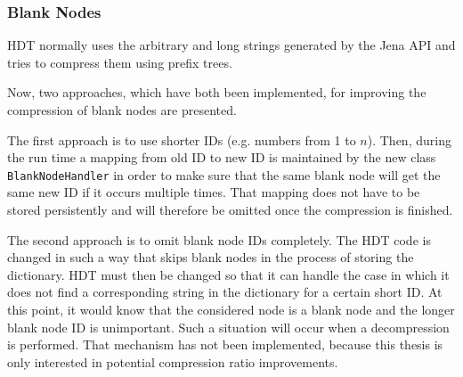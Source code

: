\subsubsection{Blank Nodes}\label{sec:implementationBlankNodes}

HDT normally uses the arbitrary and long strings generated by the Jena API and tries to compress them using prefix trees.

Now, two approaches, which have both been implemented, for improving the compression of blank nodes are presented.

The first approach is to use shorter IDs (e.g. numbers from 1 to $n$). Then, during the run time a mapping from old ID to new ID is maintained by the new class {\tt BlankNodeHandler} in order to make sure that the same blank node will get the same new ID if it occurs multiple times. That mapping does not have to be stored persistently and will therefore be omitted once the compression is finished.

The second approach is to omit blank node IDs completely. The HDT code is changed in such a way that skips blank nodes in the process of storing the dictionary. HDT must then be changed so that it can handle the case in which it does not find a corresponding string in the dictionary for a certain short ID. At this point, it would know that the considered node is a blank node and the longer blank node ID is unimportant. Such a situation will occur when a decompression is performed. That mechanism has not been implemented, because this thesis is only interested in potential compression ratio improvements.

















